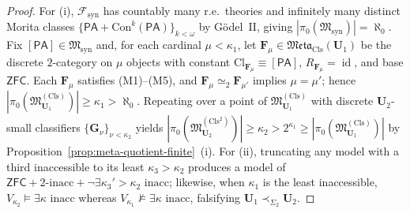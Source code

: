 \documentclass[11pt]{article}
\theoremstyle{plain}
\theoremstyle{definition}
\newcommand{\cF}{\mathcal{F}}
\newcommand{\fM}{\mathfrak{M}}
\newcommand{\Meta}{\mathfrak{Meta}}
\newcommand{\Cl}{\mathrm{Cl}}
\newcommand{\Con}{\mathrm{Con}}
\newcommand{\PA}{\mathsf{PA}}
\newcommand{\ZFC}{\mathsf{ZFC}}
\DeclareMathOperator{\id}{id}
\begin{document}
\begin{proof}
For (i), $\cF_{\mathrm{syn}}$ has countably many r.e.\ theories and infinitely many distinct Morita classes $\{\PA + \Con^k(\PA)\}_{k<\omega}$ by G\"odel~II, giving $|\pi_0(\fM_{\mathrm{syn}})| = \aleph_0$. Fix $[\PA] \in \fM_{\mathrm{syn}}$ and, for each cardinal $\mu < \kappa_1$, let $\mathbf{F}_\mu \in \Meta_{\mathrm{Cls}}(\mathbf{U}_1)$ be the discrete $2$-category on $\mu$ objects with constant $\Cl_{\mathbf{F}_\mu} \equiv [\PA]$, $R_{\mathbf{F}_\mu} = \id$, and base $\ZFC$. Each $\mathbf{F}_\mu$ satisfies (M1)--(M5), and $\mathbf{F}_\mu \simeq_2 \mathbf{F}_{\mu'}$ implies $\mu = \mu'$; hence $|\pi_0(\fM^{(\mathrm{Cls})}_{\mathbf{U}_1})| \ge \kappa_1 > \aleph_0$. Repeating over a point of $\fM^{(\mathrm{Cls})}_{\mathbf{U}_1}$ with discrete $\mathbf{U}_2$-small classifiers $\{\mathbf{G}_\nu\}_{\nu < \kappa_2}$ yields $|\pi_0(\fM^{(\mathrm{Cls}^2)}_{\mathbf{U}_2})| \ge \kappa_2 > 2^{\kappa_1} \ge |\pi_0(\fM^{(\mathrm{Cls})}_{\mathbf{U}_1})|$ by Proposition~\ref{prop:meta-quotient-finite}~(i). For (ii), truncating any model with a third inaccessible to its least $\kappa_3 > \kappa_2$ produces a model of $\ZFC + 2\text{-inacc} + \neg\exists \kappa_3' > \kappa_2\text{ inacc}$; likewise, when $\kappa_1$ is the least inaccessible, $V_{\kappa_2} \models \exists \kappa\text{ inacc}$ whereas $V_{\kappa_1} \not\models \exists \kappa\text{ inacc}$, falsifying $\mathbf{U}_1 \prec_{\Sigma_2} \mathbf{U}_2$.
\end{proof}
\end{document}
